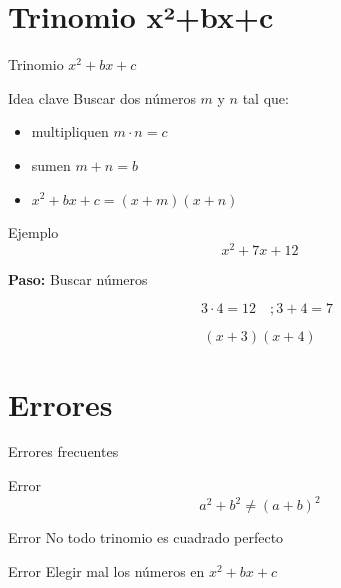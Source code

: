 \documentclass[aspectratio=169,12pt]{beamer}
\newcommand{\Paso}[1]{
	\textbf{Paso:} #1
}
\begin{document}
	\section{Trinomio x²+bx+c}
	
	\begin{frame}{Trinomio \(x^2+bx+c\)}
		
		\begin{block}{Idea clave}
			Buscar dos números $m$ y $n$ tal que:
			\begin{itemize}
				\item multipliquen \(m \cdot n= c\)
				\item sumen \(m+n=b\)
				\item \(x^2+bx+c=(x+m)(x+n)\)
			\end{itemize}
		\end{block}
		
		\pause
		
		\begin{block}{Ejemplo}
			\[
			x^2 + 7x + 12
			\]
			
			\pause
			\Paso{Buscar números}
			
			\pause
			\[
			\quad 3\cdot4 = 12
			\quad ; 3 + 4 = 7
			\]
			
			\pause
			\[
			(x+3)(x+4)
			\]
			
		\end{block}
		
	\end{frame}
	
	\section{Errores}
	
	\begin{frame}{Errores frecuentes}
		
		\begin{alertblock}{Error}
			\[
			a^2 + b^2 \neq (a+b)^2
			\]
		\end{alertblock}
		
		\pause
		
		\begin{alertblock}{Error}
			No todo trinomio es cuadrado perfecto
		\end{alertblock}
		
		\pause
		
		\begin{alertblock}{Error}
			Elegir mal los números en \(x^2+bx+c\)
		\end{alertblock}
		
	\end{frame}
	
\end{document}
